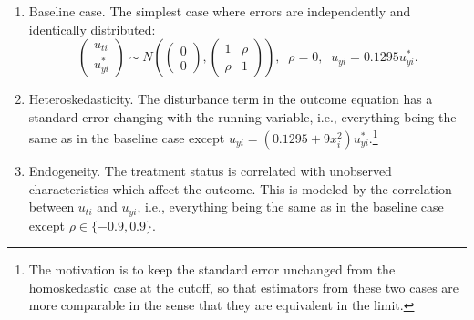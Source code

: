 \documentclass[12pt,]{article}
\DeclareMathOperator{\1}{\mathbbm{1}}
\begin{document}
\begin{enumerate}
	\item Baseline case. The simplest case where errors are independently and identically distributed:
		\begin{equation*}
		\left( {\begin{array}{*{20}{c}}
			{{u_{ti}}}\\
			{{u_{yi}^*}}
			\end{array}} \right) \sim N\left( {\left( {\begin{array}{*{20}{c}}
				0\\
				0
				\end{array}} \right),\left( {\begin{array}{*{20}{c}}
				1&\rho \\
				\rho &1
				\end{array}} \right)} \right), \;\;
			\rho = 0, \;\;
			u_{yi} = 0.1295 u_{yi}^*.
		\end{equation*}
	\item Heteroskedasticity. The disturbance term in the outcome equation has a standard error changing with the running variable, i.e., everything being the same as in the baseline case except $u_{yi} = (0.1295 + 9 x_i^2) u_{yi}^*$.\footnote{The motivation is to keep the standard error unchanged from the homoskedastic case at the cutoff, so that estimators from these two cases are more comparable in the sense that they are equivalent in the limit.}

	\item Endogeneity. The treatment status is correlated with unobserved characteristics which affect the outcome. This is modeled by the correlation between $u_{ti}$ and $u_{yi}$, i.e., everything being the same as in the baseline case except $\rho \in \{-0.9, 0.9\}$.
\end{enumerate} 
\end{document}
